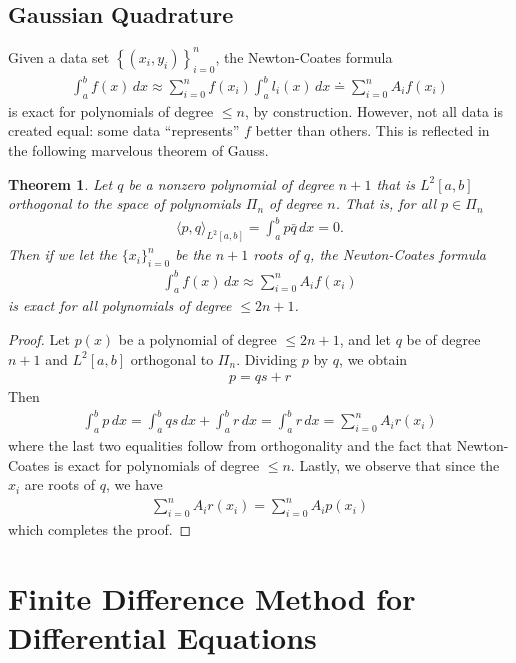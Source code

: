 \documentclass[12pt]{article}
\theoremstyle{plain}
\newtheorem{theorem}{Theorem}
\theoremstyle{definition}
\theoremstyle{remark}
\numberwithin{equation}{section}  %
\begin{document}
		\subsection{Gaussian Quadrature}
		Given a data set $ \left\{ (x_i, y_i) \right\}_{i = 0}^n $, the
		Newton-Coates formula
		\begin{align*}
			\int_a^b f(x)\, dx \approx \sum_{i=0}^n f(x_i)\int_a^b l_i(x)\, dx 
			\doteq \sum_{i=0}^n A_i f(x_i)
		\end{align*}
		is exact for polynomials of degree $\le n$, by construction. However, not all
		data is created equal: some data ``represents'' $f$ better than others.
		This is reflected in the following marvelous theorem of Gauss. 
		\begin{theorem}
			Let $q$ be a nonzero polynomial of degree $n + 1$ that is $L^2[a,b]$ orthogonal
			to the space of polynomials $\Pi_n$ of degree $n$. That is, for all $p \in
			\Pi_n$
			\begin{align*}
				\langle p,q \rangle_{L^2[a,b]}  = \int_a^b p \bar{q} \, dx = 0.
			\end{align*}
			Then if we let the $\{ x_i \}_{i=0}^{n}$ be the $n+1$ roots of $q$, the 
			Newton-Coates formula
			\begin{align*}
				\int_a^b f(x) \, dx \approx \sum_{i=0}^n A_i f(x_i)
			\end{align*}
			is exact for all polynomials of degree $\le 2n + 1$.
		\end{theorem}
		\begin{proof}
			Let $p(x)$ be a polynomial of degree $\le 2n+1$, and let $q$ be of degree
			$n+1$ and $L^2[a,b]$ orthogonal to $\Pi_n$. Dividing $p$ by $q$, we obtain
			\begin{align*}
				p = qs + r  
			\end{align*}
			Then 
			\begin{align*}
				\int_a^b p \, dx = \int_a^b qs \, dx + \int_a^b
				r \, dx = \int_a^b r \, dx = \sum_{i=0}^n A_i r(x_i) 
			\end{align*}
			where the last two equalities follow from orthogonality and the fact
			that Newton-Coates is exact for polynomials of degree $\le n$. Lastly,
			we observe that since the $x_i$ are roots of $q$, we have
			\begin{align*}
				\sum_{i = 0}^n A_i r(x_i) = \sum_{i=0}^n A_i p(x_i)
			\end{align*}
			which completes the proof. 
		\end{proof}
		\section{Finite Difference Method for Differential Equations}
\end{document}

